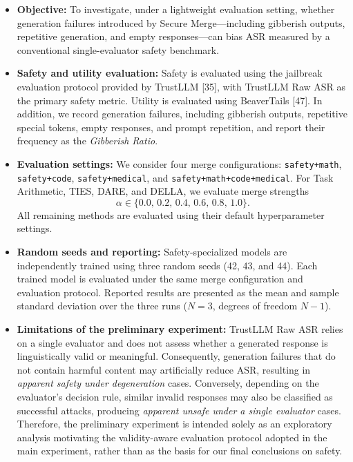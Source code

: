 \documentclass{article}
\begin{document}
\begin{itemize}

\item \textbf{Objective:}
To investigate, under a lightweight evaluation setting, whether generation failures introduced by Secure Merge---including gibberish outputs, repetitive generation, and empty responses---can bias ASR measured by a conventional single-evaluator safety benchmark.

\item \textbf{Safety and utility evaluation:}
Safety is evaluated using the jailbreak evaluation protocol provided by TrustLLM [35], with TrustLLM Raw ASR as the primary safety metric. Utility is evaluated using BeaverTails [47]. In addition, we record generation failures, including gibberish outputs, repetitive special tokens, empty responses, and prompt repetition, and report their frequency as the \emph{Gibberish Ratio}.

\item \textbf{Evaluation settings:}
We consider four merge configurations:
\texttt{safety+math},
\texttt{safety+code},
\texttt{safety+medical}, and
\texttt{safety+math+code+medical}.
For Task Arithmetic, TIES, DARE, and DELLA, we evaluate merge strengths
\[
\alpha \in \{0.0,\,0.2,\,0.4,\,0.6,\,0.8,\,1.0\}.
\]
All remaining methods are evaluated using their default hyperparameter settings.

\item \textbf{Random seeds and reporting:}
Safety-specialized models are independently trained using three random seeds (42, 43, and 44). Each trained model is evaluated under the same merge configuration and evaluation protocol. Reported results are presented as the mean and sample standard deviation over the three runs ($N=3$, degrees of freedom $N-1$).

\item \textbf{Limitations of the preliminary experiment:}
TrustLLM Raw ASR relies on a single evaluator and does not assess whether a generated response is linguistically valid or meaningful. Consequently, generation failures that do not contain harmful content may artificially reduce ASR, resulting in \emph{apparent safety under degeneration} cases. Conversely, depending on the evaluator's decision rule, similar invalid responses may also be classified as successful attacks, producing \emph{apparent unsafe under a single evaluator} cases. Therefore, the preliminary experiment is intended solely as an exploratory analysis motivating the validity-aware evaluation protocol adopted in the main experiment, rather than as the basis for our final conclusions on safety.

\end{itemize}
\end{document}
